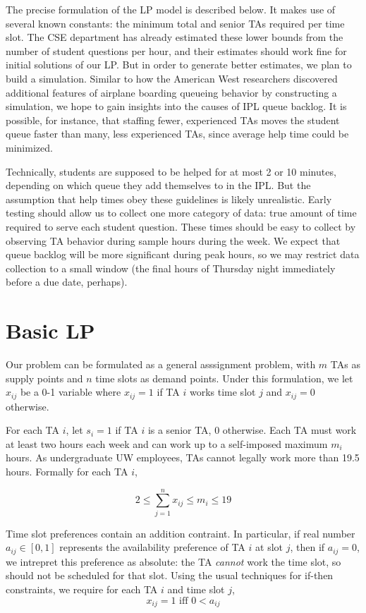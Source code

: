 \documentclass{article}
\begin{document}
\begin{multicols}{2}
The precise formulation of the LP model is described below. It makes use of several known constants: the minimum total and senior TAs required per time slot. The CSE department has already estimated these lower bounds from the number of student questions per hour, and their estimates should work fine for initial solutions of our LP. But in order to generate better estimates, we plan to build a simulation. Similar to how the American West researchers discovered additional features of airplane boarding queueing behavior by constructing a simulation, we hope to gain insights into the causes of IPL queue backlog. It is possible, for instance, that staffing fewer, experienced TAs moves the student queue faster than many, less experienced TAs, since average help time could be minimized.

Technically, students are supposed to be helped for at most 2 or 10 minutes, depending on which queue they add themselves to in the IPL. But the assumption that help times obey these guidelines is likely unrealistic. Early testing should allow us to collect one more category of data: true amount of time required to serve each student question. These times should be easy to collect by observing TA behavior during sample hours during the week. We expect that queue backlog will be more significant during peak hours, so we may restrict data collection to a small window (the final hours of Thursday night immediately before a due date, perhaps). 

\section*{Basic LP}
Our problem can be formulated as a general asssignment problem, with $m$ TAs as supply points and $n$ time slots as demand points. Under this formulation, we let $x_{ij}$ be a 0-1 variable where $x_{ij} = 1$ if TA $i$ works time slot $j$ and $x_{ij} = 0$ otherwise.

For each TA $i$, let $s_i = 1$ if TA $i$ is a senior TA, 0 otherwise. Each TA must work at least two hours each week and can work up to a self-imposed maximum $m_i$ hours. As undergraduate UW employees, TAs cannot legally work more than 19.5 hours. Formally for each TA $i$,

\begin{equation}
2 \leq \sum_{j=1}^{n}x_{ij} \leq m_i \leq 19
\end{equation}

Time slot preferences contain an addition contraint. In particular, if real number $a_{ij} \in [0,1]$ represents the availability preference of TA $i$ at slot $j$, then if $a_{ij} = 0$, we intrepret this preference as absolute: the TA \textit{cannot} work the time slot, so should not be scheduled for that slot. Using the usual techniques for if-then constraints, we require for each TA $i$ and time slot $j$,
\begin{equation}
x_{ij} = 1 \textrm{ iff } 0 < a_{ij}
\end{equation}


\end{multicols}
\end{document}

